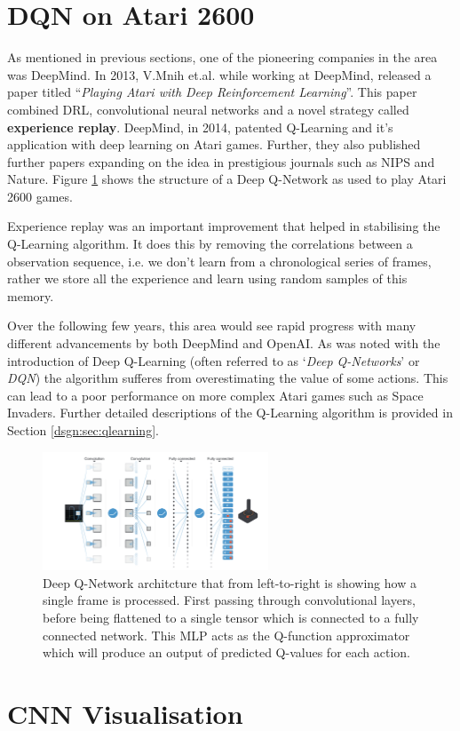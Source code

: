 \section{DQN on Atari 2600}
\label{bg:sec:dqn}
As mentioned in previous sections, one of the pioneering companies in the area was DeepMind. In 2013, V.Mnih et.al. while working at DeepMind, released a paper titled ``\textit{Playing Atari with Deep Reinforcement Learning}''\cite{dqn}. This paper combined DRL, convolutional neural networks and a novel strategy called \textbf{experience replay}. DeepMind, in 2014, patented Q-Learning and it's application with deep learning on Atari games. Further, they also published further papers expanding on the idea in prestigious journals such as NIPS and Nature. Figure \ref{fig:q-learning-arch} shows the structure of a Deep Q-Network as used to play Atari 2600 games.

Experience replay was an important improvement that helped in stabilising the Q-Learning algorithm. It does this by removing the correlations between a observation sequence, i.e. we don't learn from a chronological series of frames, rather we store all the experience and learn using random samples of this memory.

Over the following few years, this area would see rapid progress with many different advancements by both DeepMind and OpenAI. As was noted with the introduction of Deep Q-Learning (often referred to as `\textit{Deep Q-Networks}' or \textit{DQN}) the algorithm sufferes from overestimating the value of some actions. This can lead to a poor performance on more complex Atari games such as Space Invaders. Further detailed descriptions of the Q-Learning algorithm is provided in Section \ref{dsgn:sec:qlearning}.

\begin{figure}[htbp]
	\centering
	\includegraphics[width=0.60\textwidth]{chapters/chapter2/images/dqn.png}
	\caption[Deep Q-Network architcture]{Deep Q-Network architcture that from left-to-right is showing how a single frame is processed. First passing through convolutional layers, before being flattened to a single tensor which is connected to a fully connected network. This MLP acts as the Q-function approximator which will produce an output of predicted Q-values for each action.
		\label{fig:q-learning-arch}
	}
\end{figure}

\section{CNN Visualisation}
\label{bg:sec:cnn-vis}
